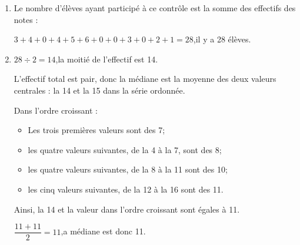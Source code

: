 		\begin{enumerate}[label=\textbf{\alph*.},left=5mm]
		\item Le nombre d'élèves ayant participé à ce contrôle est la somme des effectifs des notes :

		$3+4+0+4+5+6+0+0+3+0+2+1=28$,\quad il y a 28 élèves.

		\item $28 \div 2 = 14$,\quad la moitié de l'effectif est 14.

		L'effectif total est pair, donc la médiane est la moyenne des deux valeurs centrales : la 14 et la 15 dans la série ordonnée.

		Dans l'ordre croissant :
		\begin{itemize}
			\item Les trois premières valeurs sont des 7;
			\item les quatre valeurs suivantes, de la 4\up{e} à la 7, sont des 8;
			\item les quatre valeurs suivantes, de la 8\up{e} à la 11 sont des 10;
			\item les cinq valeurs suivantes, de la 12\up{e} à la 16 sont des 11.
		\end{itemize}

		Ainsi, la 14 et la valeur dans l'ordre croissant sont égales à 11.

		$\dfrac{11+11}{2}=11$,\quad a médiane est donc 11.
		\end{enumerate}
